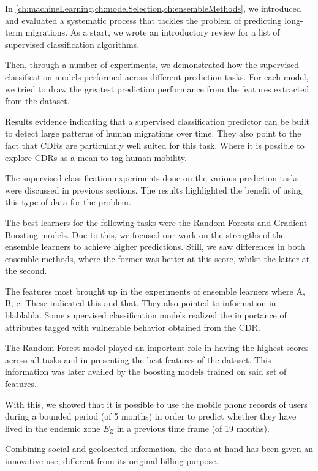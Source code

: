 In \cref{ch:machineLearning,ch:modelSelection,ch:ensembleMethods}, we introduced and evaluated a systematic process that tackles the problem of predicting long-term migrations.
As a start, we wrote an introductory review for a list of supervised classification algorithms.

Then, through a number of experiments, we demonstrated how the supervised classification models performed across different prediction tasks.
For each model, we tried to draw the greatest prediction performance from the features extracted from the dataset.

Results evidence indicating that a supervised classification predictor can be built to detect large patterns of human migrations over time.
They also point to the fact that CDRs are particularly well suited for this task.
Where it is possible to explore CDRs as a mean to tag human mobility.


The supervised classification experiments done on the various prediction tasks were discussed in previous sections.
The results highlighted the benefit of using this type of data for the problem.


The best learners for the following tasks were the Random Forests and Gradient Boosting models.
Due to this, we focused our work on the strengths of the ensemble learners to achieve higher predictions.
Still, we saw differences in both ensemble methods, where the former was better at this score, whilst the latter at the second.


The features most brought up in the experiments of ensemble learners where A, B, c.
These indicated this and that.
They also pointed to information in  blablabla.
Some supervised classification models realized the importance of attributes tagged with vulnerable behavior obtained from the CDR.\@

The Random Forest model played an important role in having the highest scores across all tasks and in presenting the best features of the dataset.
This information was later availed by the boosting models trained on said set of features.



With this, we showed that it is possible to use the mobile phone records of users during a bounded period (of 5 months) in order to predict whether they have lived in the endemic zone $E_Z$ in a previous time frame (of 19 months).

Combining social and geolocated information, the data at hand has been given an innovative use, different from its original billing purpose.

